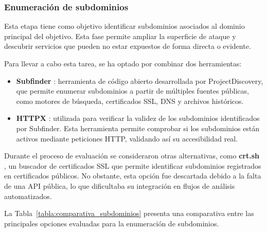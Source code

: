 \begin{parskipenv}
\subsubsection*{Enumeración de subdominios}
Esta etapa tiene como objetivo identificar subdominios asociados al dominio principal del objetivo. Esta fase permite ampliar la superficie de ataque y descubrir servicios que pueden no estar expuestos de forma directa o evidente.

Para llevar a cabo esta tarea, se ha optado por combinar dos herramientas:

\begin{itemize}
    \item \textbf{Subfinder} \cite{subfinder}: herramienta de código abierto desarrollada por ProjectDiscovery, que permite enumerar subdominios a partir de múltiples fuentes públicas, como motores de búsqueda, certificados SSL, DNS y archivos históricos.

    \item \textbf{HTTPX} \cite{httpx}: utilizada para verificar la validez de los subdominios identificados por Subfinder. Esta herramienta permite comprobar si los subdominios están activos mediante peticiones HTTP, validando así su accesibilidad real.
\end{itemize}

Durante el proceso de evaluación se consideraron otras alternativas, como \textbf{crt.sh} \cite{crtsh}, un buscador de certificados SSL que permite identificar subdominios registrados en certificados públicos. No obstante, esta opción fue descartada debido a la falta de una API pública, lo que dificultaba su integración en flujos de análisis automatizados.

La Tabla~\ref{tabla:comparativa_subdominios} presenta una comparativa entre las principales opciones evaluadas para la enumeración de subdominios.

\begin{table}[H]
\centering
\renewcommand{\arraystretch}{1.4}
\caption{Comparativa de herramientas para enumeración de subdominios.}
\label{tabla:comparativa_subdominios}
\end{table}


\end{parskipenv}

